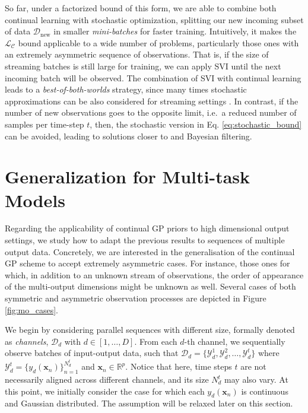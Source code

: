 \documentclass[]{article}
\newcommand{\Dcal}{\mathcal{D}}
\newcommand{\Ycal}{\mathcal{Y}}
\newcommand{\Lcal}{\mathcal{L}}
\newcommand{\xc}{\bm{x}}
\begin{document}
So far, under a factorized bound of this form, we are able to combine both continual learning with stochastic optimization, splitting our new incoming subset of data $\Dcal_{\text{new}}$ in smaller \textit{mini-batches} for faster training. Intuitively, it makes the $\Lcal_{\mathcal{C}}$ bound applicable to a wide number of problems, particularly those ones with an extremely asymmetric sequence of observations. That is, if the size of streaming batches is still large for training, we can apply SVI until the next incoming batch will be observed. The combination of SVI with continual learning leads to a \textit{best-of-both-worlds} strategy, since many times stochastic approximations can be also considered for streaming settings \citep{hensman2013gaussian}. In contrast, if the number of new observations goes to the opposite limit,  i.e.\ a reduced number of samples per time-step $t$, then, the stochastic version in Eq. \eqref{eq:stochastic_bound} can be avoided, leading to solutions closer to \citet{solin2018infinite} and Bayesian filtering.

\section{Generalization for Multi-task Models}
\label{sec:continual_mogp}
Regarding the applicability of continual GP priors to high dimensional output settings, we study how to adapt the previous results to sequences of multiple output data. Concretely, we are interested in the generalisation of the continual GP scheme to accept extremely asymmetric cases. For instance, those ones for which, in addition to an unknown stream of  observations, the order of appearance of the multi-output dimensions might be unknown as well. Several cases of both symmetric and asymmetric observation processes are depicted in Figure \ref{fig:mo_cases}.


We begin by considering parallel sequences with different size, formally denoted as \textit{channels}, $\Dcal_d$ with $d \in [1,\dots, D]$. From each $d$-th channel, we sequentially observe batches of input-output data, such that $\Dcal_d = \{\Ycal^{1}_{d},\Ycal^{2}_{d}, \dots, \Ycal^{t}_{d}\}$ where $\Ycal^{t}_{d} = \{y_d(\xc_n)\}^{N^{t}_{d}}_{n=1}$ and $\xc_n \in \mathbb{R}^p$. Notice that here, time steps $t$ are not necessarily aligned across different channels, and its size $N^{t}_{d}$ may also vary. At this point, we initially consider the case for which each $y_d(\xc_n)$ is continuous and Gaussian distributed. The assumption will be relaxed later on this section.
\end{document}
